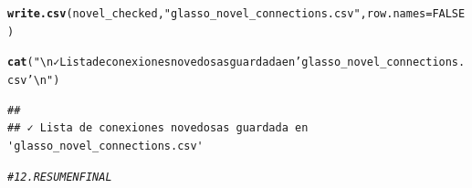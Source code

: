 \documentclass{article}\usepackage[]{graphicx}\usepackage[]{xcolor}
\makeatletter
\newcommand{\hlnum}[1]{\textcolor[rgb]{0.686,0.059,0.569}{#1}}%
\newcommand{\hlsng}[1]{\textcolor[rgb]{0.192,0.494,0.8}{#1}}%
\newcommand{\hlcom}[1]{\textcolor[rgb]{0.678,0.584,0.686}{\textit{#1}}}%
\newcommand{\hldef}[1]{\textcolor[rgb]{0.345,0.345,0.345}{#1}}%
\newcommand{\hlkwc}[1]{\textcolor[rgb]{0.333,0.667,0.333}{#1}}%
\newcommand{\hlkwd}[1]{\textcolor[rgb]{0.737,0.353,0.396}{\textbf{#1}}}%
\newenvironment{kframe}{%
 \def\at@end@of@kframe{}%
 \ifinner\ifhmode%
  \def\at@end@of@kframe{\end{minipage}}%
  \begin{minipage}{\columnwidth}%
 \fi\fi%
 \def\FrameCommand##1{\hskip\@totalleftmargin \hskip-\fboxsep
 \colorbox{shadecolor}{##1}\hskip-\fboxsep
     \hskip-\linewidth \hskip-\@totalleftmargin \hskip\columnwidth}%
 \MakeFramed {\advance\hsize-\width
   \@totalleftmargin\z@ \linewidth\hsize
   \@setminipage}}%
 {\par\unskip\endMakeFramed%
 \at@end@of@kframe}
\newenvironment{knitrout}{}{} %
\makeatother
\begin{document}
\begin{knitrout}
\color{fgcolor}\begin{kframe}
\begin{alltt}
\hlkwd{write.csv}\hldef{(novel_checked,} \hlsng{"glasso_novel_connections.csv"}\hldef{,} \hlkwc{row.names} \hldef{=} \hlnum{FALSE}\hldef{)}
\end{alltt}


{\ttfamily\noindent\bfseries\color{errorcolor}{\#\# Error in eval(expr, p): object 'novel\_checked' not found}}\begin{alltt}
\hlkwd{cat}\hldef{(}\hlsng{"\textbackslash{}n✓ Lista de conexiones novedosas guardada en 'glasso_novel_connections.csv'\textbackslash{}n"}\hldef{)}
\end{alltt}
\begin{verbatim}
## 
## ✓ Lista de conexiones novedosas guardada en 'glasso_novel_connections.csv'
\end{verbatim}
\end{kframe}
\end{knitrout}
\begin{knitrout}
\color{fgcolor}\begin{kframe}
\begin{alltt}
\hlcom{# 12. RESUMEN FINAL}
\end{alltt}
\end{kframe}
\end{knitrout}
\end{document}

